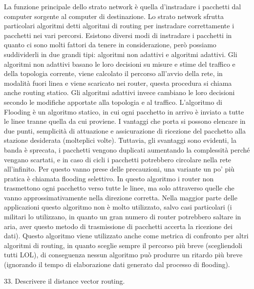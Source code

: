 La funzione principale dello strato network è quella d’instradare i pacchetti dal computer sorgente al computer di destinazione.
Lo strato network sfrutta particolari algoritmi detti algoritmi di routing per instradare correttamente i pacchetti nei vari percorsi. Esistono diversi modi di instradare i pacchetti in quanto ci sono molti fattori da tenere in considerazione, però possiamo suddividerli in due grandi tipi: algoritmi non adattivi e algoritmi adattivi.
Gli algoritmi non adattivi basano le loro decisioni su misure e stime del traffico e della topologia corrente, viene calcolato il percorso all’avvio della rete, in modalità fuori linea e viene scaricato nei router, questa procedura si chiama anche routing statico. Gli algoritmi adattivi invece cambiano le loro decisioni secondo le modifiche apportate alla topologia e al traffico.
L’algoritmo di Flooding è un algoritmo statico, in cui ogni pacchetto in arrivo è inviato a tutte le linee tranne quella da cui proviene. I vantaggi che porta si possono elencare in due punti, semplicità di attuazione e assicurazione di ricezione del pacchetto alla stazione desiderata (molteplici volte).
Tuttavia, gli svantaggi sono evidenti, la banda è sprecata, i pacchetti vengono duplicati aumentando la complessità perché vengano scartati, e in caso di cicli i pacchetti potrebbero circolare nella rete all’infinito.
Per questo vanno prese delle precauzioni, una variante un po’ più pratica è chiamata flooding selettivo. In questo algoritmo i router non trasmettono ogni pacchetto verso tutte le linee, ma solo attraverso quelle che vanno approssimativamente nella direzione corretta.
Nella maggior parte delle applicazioni questo algoritmo non è molto utilizzato, salvo casi particolari (i militari lo utilizzano, in quanto un gran numero di router potrebbero saltare in aria, aver questo metodo di trasmissione di pacchetti accerta la ricezione dei dati).
Questo algoritmo viene utilizzato anche come metrica di confronto per altri algoritmi di routing, in quanto sceglie sempre il percorso più breve (scegliendoli tutti LOL), di conseguenza nessun algoritmo può produrre un ritardo più breve (ignorando il tempo di elaborazione dati generato dal processo di flooding).
 

33.	Descrivere il distance vector routing.

